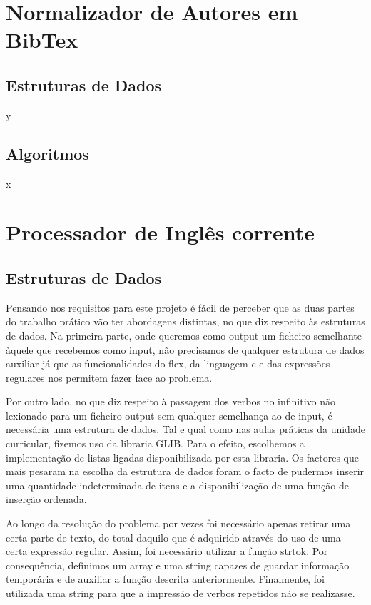 \documentclass{report}
\begin{document}
\section{Normalizador de Autores em BibTex}
\subsection{Estruturas de Dados}
y
\subsection{Algoritmos}
x

\section{Processador de Inglês corrente}
\subsection{Estruturas de Dados}
Pensando nos requisitos para este projeto é fácil de perceber que as duas partes do trabalho prático vão ter abordagens distintas, no que diz respeito às estruturas de dados. Na primeira parte, onde queremos como output um ficheiro semelhante àquele que recebemos como input, não precisamos de qualquer estrutura de dados auxiliar já que as funcionalidades do flex, da linguagem c e das expressões regulares nos permitem fazer face ao problema.

Por outro lado, no que diz respeito à passagem dos verbos no infinitivo não lexionado para um ficheiro output sem qualquer semelhança ao de input, é necessária uma estrutura de dados. Tal e qual como nas aulas práticas da unidade curricular, fizemos uso da libraria GLIB. Para o efeito, escolhemos a implementação de listas ligadas disponibilizada por esta libraria. Os factores que mais pesaram na escolha da estrutura de dados foram o facto de pudermos inserir uma quantidade indeterminada de itens  e a disponibilização de uma função de inserção ordenada. 

Ao longo da resolução do problema por vezes foi necessário apenas retirar uma certa parte de texto, do total daquilo que é adquirido através do uso de uma certa expressão regular. Assim, foi necessário utilizar a função strtok. Por consequência,  definimos um array e uma string capazes de guardar informação temporária e de auxiliar a função descrita anteriormente. Finalmente, foi utilizada uma string para que a impressão de verbos repetidos não se realizasse. 
\end{document}
